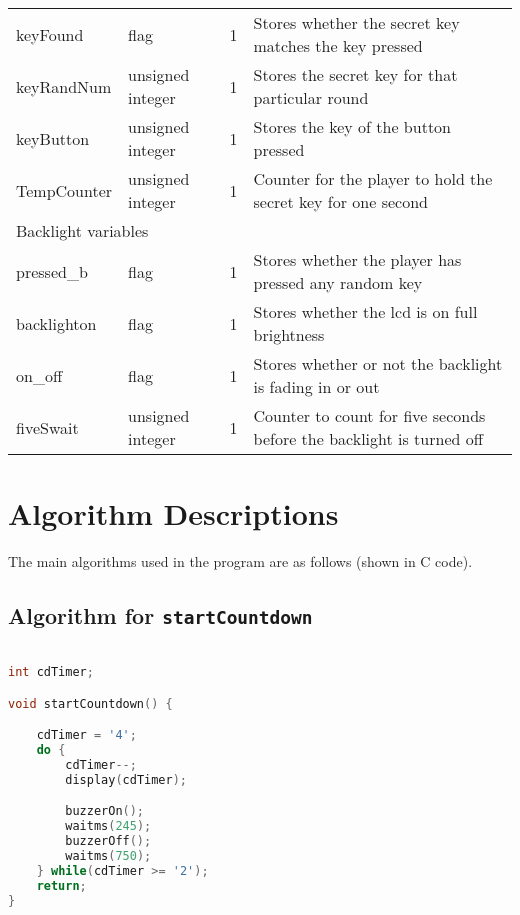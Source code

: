 \documentclass[a4paper]{article}
\begin{document}
\begin{table}[H]
\begin{tabular}{@{}lllp{9cm}@{}}
		keyFound	 & flag				& 1 & Stores whether the secret key matches the key pressed\\
		keyRandNum	 & unsigned integer & 1 & Stores the secret key for that particular round\\
		keyButton    & unsigned integer & 1 & Stores the key of the button pressed\\
		TempCounter  & unsigned integer & 1 & Counter for the player to hold the secret key for one second\\
		\midrule
		\multicolumn{4}{l}{Backlight variables} \\ \midrule
		pressed\_b	 & flag				& 1 & Stores whether the player has pressed any random key\\
		backlighton  & flag 			& 1 & Stores whether the lcd is on full brightness\\
		on\_off      & flag 			& 1 & Stores whether or not the backlight is fading in or out\\
		fiveSwait	 & unsigned integer & 1 & Counter to count for five seconds before the backlight is turned off\\

		\bottomrule
	\end{tabular}
\end{table}

\section{Algorithm Descriptions}

The main algorithms used in the program are as follows (shown in C code).

\subsection{Algorithm for \texttt{startCountdown}}
\begin{lstlisting}[language=C]

int cdTimer;

void startCountdown() {

	cdTimer = '4';
	do {
		cdTimer--;
		display(cdTimer);

		buzzerOn();
		waitms(245);
		buzzerOff();
		waitms(750);
	} while(cdTimer >= '2');
	return;
}		

\end{lstlisting}
\end{document}
